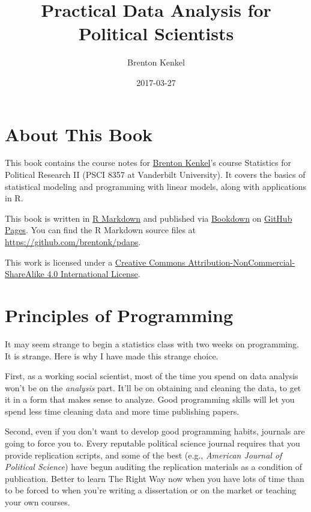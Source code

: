 \documentclass[12pt,oneside,openany]{book}
\title{Practical Data Analysis for Political Scientists}
\author{Brenton Kenkel}
\date{2017-03-27}
\begin{document}
\maketitle

{
\setcounter{tocdepth}{1}
\tableofcontents
}
\chapter{About This Book}\label{about-this-book}

This book contains the course notes for
\href{http://bkenkel.com}{Brenton Kenkel}'s course Statistics for
Political Research II (PSCI 8357 at Vanderbilt University). It covers
the basics of statistical modeling and programming with linear models,
along with applications in R.

This book is written in \href{http://rmarkdown.rstudio.com}{R Markdown}
and published via \href{https://bookdown.org}{Bookdown} on
\href{https://pages.github.com}{GitHub Pages}. You can find the R
Markdown source files at \url{https://github.com/brentonk/pdaps}.

This work is licensed under a
\href{http://creativecommons.org/licenses/by-nc-sa/4.0/}{Creative
Commons Attribution-NonCommercial-ShareAlike 4.0 International License}.

\hypertarget{programming}{\chapter{Principles of
Programming}\label{programming}}

It may seem strange to begin a statistics class with two weeks on
programming. It is strange. Here is why I have made this strange choice.

First, as a working social scientist, most of the time you spend on data
analysis won't be on the \emph{analysis} part. It'll be on obtaining and
cleaning the data, to get it in a form that makes sense to analyze. Good
programming skills will let you spend less time cleaning data and more
time publishing papers.

Second, even if you don't want to develop good programming habits,
journals are going to force you to. Every reputable political science
journal requires that you provide replication scripts, and some of the
best (e.g., \emph{American Journal of Political Science}) have begun
auditing the replication materials as a condition of publication. Better
to learn The Right Way now when you have lots of time than to be forced
to when you're writing a dissertation or on the market or teaching your
own courses.
\end{document}
